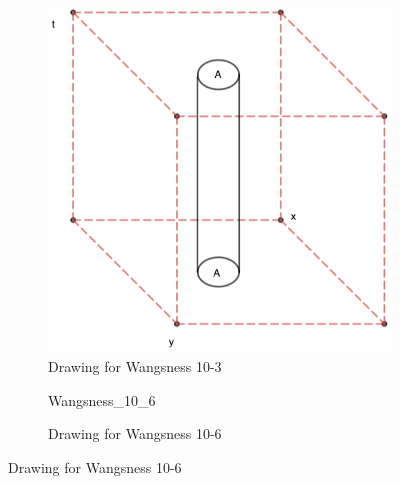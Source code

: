 \documentclass[crop=false,class=book,oneside]{standalone}
\begin{document}
            \begin{figure}[htbp]
                \centering
                \begin{subfigure}[b]{0.49\textwidth}
                    \centering
                    \captionsetup{type=figure}
                    \includegraphics[scale=0.4]{10-3.png}
                    \caption{Drawing for Wangsness 10-3}
                \end{subfigure}
                \begin{subfigure}[b]{0.49\textwidth}
                    \centering
                    \captionsetup{type=figure}
                    {Wangsness_10_6}
                    \caption{Drawing for Wangsness 10-6}
                \end{subfigure}
            \end{figure}
\end{document}
